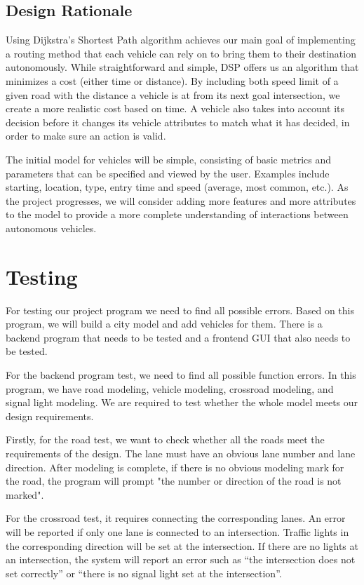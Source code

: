 \documentclass[onecolumn, draftclsnofoot,10pt, compsoc]{IEEEtran}
\begin{document}
\subsection{Design Rationale}
Using Dijkstra’s Shortest Path algorithm achieves our main goal of implementing a routing method that each vehicle can rely on to bring them to their destination autonomously.
While straightforward and simple, DSP offers us an algorithm that minimizes a cost (either time or distance).
By including both speed limit of a given road with the distance a vehicle is at from its next goal intersection, we create a more realistic cost based on time.
A vehicle also takes into account its decision before it changes its vehicle attributes to match what it has decided, in order to make sure an action is valid.

The initial model for vehicles will be simple, consisting of basic metrics and parameters that can be specified and viewed by the user.
Examples include starting, location, type, entry time and speed (average, most common, etc.).
As the project progresses, we will consider adding more features and more attributes to the model to provide a more complete understanding of interactions between autonomous vehicles.
\section{Testing}
For testing our project program we need to find all possible errors.
Based on this program, we will build a city model and add vehicles for them.
There is a backend program that needs to be tested and a frontend GUI that also needs to be tested.

For the backend program test, we need to find all possible function errors.
In this program, we have road modeling, vehicle modeling, crossroad modeling, and signal light modeling.
We are required to test whether the whole model meets our design requirements.

Firstly, for the road test, we want to check whether all the roads meet the requirements of the design.
The lane must have an obvious lane number and lane direction.
After modeling is complete, if there is no obvious modeling mark for the road, the program will prompt "the number or direction of the road is not marked".

For the crossroad test, it requires connecting the corresponding lanes.
An error will be reported if only one lane is connected to an intersection.
Traffic lights in the corresponding direction will be set at the intersection.
If there are no lights at an intersection, the system will report an error such as “the intersection does not set correctly” or “there is no signal light set at the intersection”.
\end{document}
